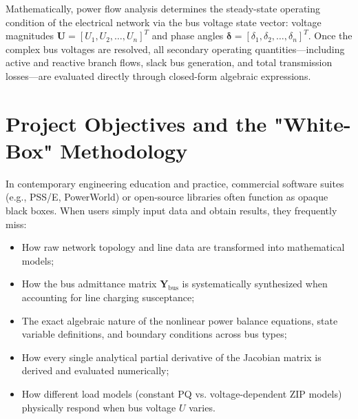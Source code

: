 \documentclass[12pt,a4paper,oneside]{report}
\begin{document}
Mathematically, power flow analysis determines the steady-state operating condition of the electrical network via the bus voltage state vector: voltage magnitudes $\mathbf{U} = [U_1, U_2, \dots, U_n]^T$ and phase angles $\boldsymbol{\delta} = [\delta_1, \delta_2, \dots, \delta_n]^T$. Once the complex bus voltages are resolved, all secondary operating quantities—including active and reactive branch flows, slack bus generation, and total transmission losses—are evaluated directly through closed-form algebraic expressions.

\section{Project Objectives and the "White-Box" Methodology}
In contemporary engineering education and practice, commercial software suites (e.g., PSS/E, PowerWorld) or open-source libraries often function as opaque black boxes. When users simply input data and obtain results, they frequently miss:
\begin{itemize}
    \item How raw network topology and line data are transformed into mathematical models;
    \item How the bus admittance matrix $\mathbf{Y}_{\text{bus}}$ is systematically synthesized when accounting for line charging susceptance;
    \item The exact algebraic nature of the nonlinear power balance equations, state variable definitions, and boundary conditions across bus types;
    \item How every single analytical partial derivative of the Jacobian matrix is derived and evaluated numerically;
    \item How different load models (constant PQ vs. voltage-dependent ZIP models) physically respond when bus voltage $U$ varies.
\end{itemize}
\end{document}
